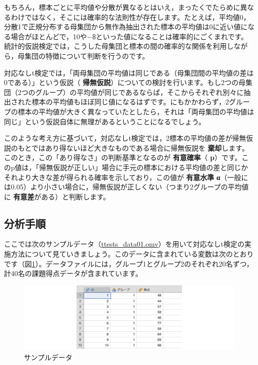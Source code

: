 \documentclass[
  12pt,
  a5jpaper,
  lualatex, ja=standard]{bxjsbook}
\renewcommand{\emph}[1]{\textbf{\color{emph} #1}}
\begin{document}
もちろん，標本ごとに平均値や分散が異なるとはいえ，まったくでたらめに異なるわけではなく，そこには確率的な法則性が存在します。たとえば，平均値0，分散1で正規分布する母集団から無作為抽出された標本の平均値は0に近い値になる場合がほとんどで，10や\(-\textsf{8}\)といった値になることは確率的にごくまれです。統計的仮説検定では，こうした母集団と標本の間の確率的な関係を利用しながら，母集団の特徴について判断を行うのです。

対応なしt検定では，「両母集団の平均値は同じである（母集団間の平均値の差は0である）」という仮説（\emph{帰無仮説}）についての検討を行います。もし2つの母集団（2つのグループ）の平均値が同じであるならば，そこからそれぞれ別々に抽出された標本の平均値もほぼ同じ値になるはずです。にもかかわらず，2グループの標本の平均値が大きく異なっていたとしたら，それは「両母集団の平均値は同じ」という仮説自体に無理があるということになるでしょう。

このような考え方に基づいて，対応なしt検定では，2標本の平均値の差が帰無仮説のもとではあり得ないほど大きなものである場合に帰無仮説を\emph{棄却}します。このとき，この「あり得なさ」の判断基準となるのが\emph{有意確率}（\emph{p}）です。このp値は，「帰無仮説が正しい」場合に手元の標本における平均値の差と同じかそれより大きな差が得られる確率を示しており，この値が\emph{有意水準} \emph{α}（一般には0.05）より小さい場合に，帰無仮説が正しくない（つまり2グループの平均値に\emph{有意差}がある）と判断します。

\hypertarget{subsec:ttests-independent-analysis}{%
\subsection{分析手順}\label{subsec:ttests-independent-analysis}}

ここでは次のサンプルデータ（\href{https://github.com/sbtseiji/jmv_compguide/raw/main/data/omv/ttests_data01.omv}{ttests\_data01.omv}）を用いて対応なしt検定の実施方法について見ていきましょう。このデータに含まれている変数は次のとおりです（図\ref{fig:ttests-data01}）。データファイルには，グループ1とグループ2のそれぞれ20名ずつ，計40名の課題得点データが含まれています。

\begin{figure}[!ht]

{\centering \includegraphics[width=1\linewidth]{images/ttests/data01} 

}

\caption{サンプルデータ}\label{fig:ttests-data01}
\end{figure}
\end{document}
